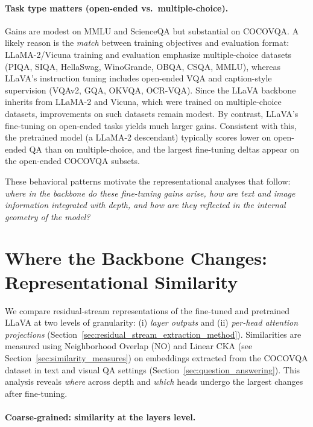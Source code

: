 \paragraph{Task type matters (open-ended vs.\ multiple-choice).}

Gains are modest on MMLU and ScienceQA but substantial on COCOVQA. A likely reason is the \emph{match} between training objectives and evaluation format: LLaMA-2/Vicuna training and evaluation emphasize multiple-choice datasets \cite{touvronLlama2Open2023,zhengJudgingLLMasaJudgeMTBench} (PIQA, SIQA, HellaSwag, WinoGrande, OBQA, CSQA, MMLU), whereas LLaVA's instruction tuning includes open-ended VQA and caption-style supervision \cite{liuVisualInstructionTuning2023,liuImprovedBaselinesVisual2024} (VQAv2, GQA, OKVQA, OCR-VQA). Since the LLaVA backbone inherits from LLaMA-2 and Vicuna, which were trained on multiple-choice datasets, improvements on such datasets remain modest. By contrast, LLaVA's fine-tuning on open-ended tasks yields much larger gains. Consistent with this, the pretrained model (a LLaMA-2 descendant) typically scores lower on open-ended QA than on multiple-choice, and the largest fine-tuning deltas appear on the open-ended COCOVQA subsets.

\medskip
These behavioral patterns motivate the representational analyses that follow: \emph{where in the backbone do these fine-tuning gains arise, how are text and image information integrated with depth, and how are they reflected in the internal geometry of the model?}

\section{Where the Backbone Changes: Representational Similarity}\label{sec:representational_similarity}

We compare residual-stream representations of the fine-tuned and pretrained LLaVA at two levels of granularity: (i) \emph{layer outputs} and (ii) \emph{per-head attention projections} (Section~\ref{sec:residual_stream_extraction_method}). Similarities are measured using Neighborhood Overlap (NO) and Linear CKA (see Section~\ref{sec:similarity_measures}) on embeddings extracted from the COCOVQA dataset in text and visual QA settings (Section~\ref{sec:question_answering}). This analysis reveals \emph{where} across depth and \emph{which} heads undergo the largest changes after fine-tuning.

\paragraph{Coarse-grained: similarity at the layers level.}

